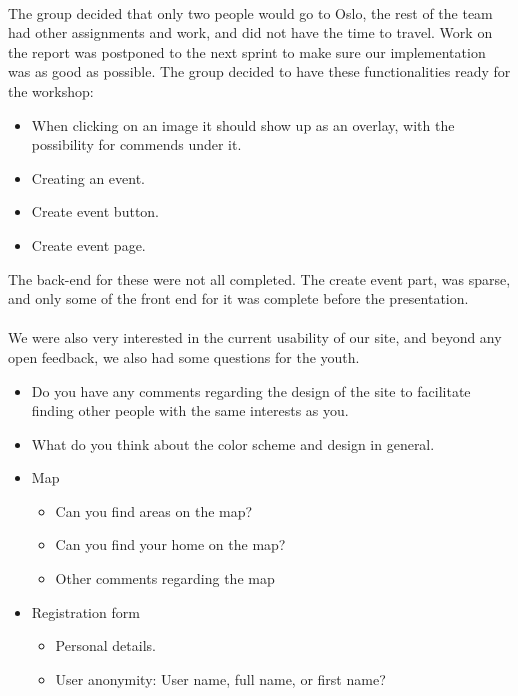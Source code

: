 \paragraph{} The group decided that only two people would go to Oslo, the rest of the team had other assignments and work, and did not have the time to travel. Work on the report was postponed to the next sprint to make sure our implementation was as good as possible. The group decided to have these functionalities ready for the workshop:

\begin{itemize}
  \item When clicking on an image it should show up as an overlay, with the possibility for commends under it.
  \item Creating an event.
  \item Create event button.
  \item Create event page.
\end{itemize} 

The back-end for these were not all completed. The create event part, was sparse, and only some of the front end for it was complete before the presentation.

\paragraph{} We were also very interested in the current usability of our site, and beyond any open feedback, we also had some questions for the youth.

\begin{itemize}
  \item Do you have any comments regarding the design of the site to facilitate finding other people with the same interests as you.
  \item What do you think about the color scheme and design in general.
  \item Map
  \begin{itemize}
    \item Can you find areas on the map?
    \item Can you find your home on the map?
    \item Other comments regarding the map
  \end{itemize}
  \item Registration form
  \begin{itemize}
    \item Personal details.
    \item User anonymity: User name, full name, or first name?
  \end{itemize}
\end{itemize}

